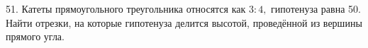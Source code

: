 51. Катеты прямоугольного треугольника относятся как $3:4,$ гипотенуза равна 50. Найти отрезки, на которые гипотенуза делится высотой, проведённой из вершины прямого угла.\\
